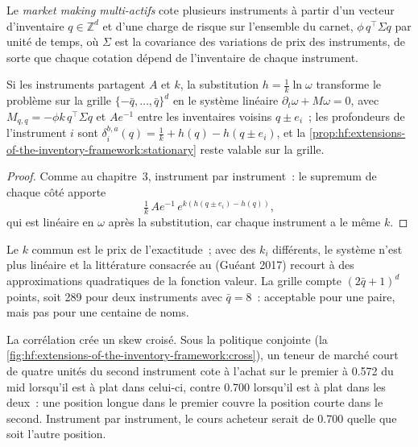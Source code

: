\begin{definition}\label{def:hf:extensions-of-the-inventory-framework:multi}
Le \emph{market making multi-actifs} cote plusieurs instruments à partir d'un vecteur d'inventaire $q\in\mathbb Z^d$ et d'une
charge de risque sur l'ensemble du carnet, $\phi\,q^\top\Sigma q$ par unité de temps, où $\Sigma$ est la covariance des variations de prix des instruments, de sorte que chaque
cotation dépend de l'inventaire de chaque instrument.
\end{definition}

\begin{proposition}\label{prop:hf:extensions-of-the-inventory-framework:multi}
Si les instruments partagent $A$ et $k$, la substitution $h=\tfrac1k\ln\omega$ transforme le problème sur la grille $\{-\bar q,\dots,\bar q\}^d$ en le
système linéaire $\partial_t\omega+M\omega=0$, avec $M_{q,q}=-\phi k\,q^\top\Sigma q$ et $Ae^{-1}$ entre les inventaires voisins $q\pm e_i$~; les
profondeurs de l'instrument $i$ sont $\delta^{b,a}_i(q)=\tfrac1k+h(q)-h(q\pm e_i)$, et la \cref{prop:hf:extensions-of-the-inventory-framework:stationary}
reste valable sur la grille.
\end{proposition}

\begin{proof}
Comme au chapitre~3, instrument par instrument~: le supremum de chaque côté apporte
\[
\tfrac1k\,Ae^{-1}\,e^{k(h(q\pm e_i)-h(q))},
\]
qui est linéaire en $\omega$ après la substitution, car chaque instrument a le même $k$.
\end{proof}

Le $k$ commun est le prix de l'exactitude~; avec des $k_i$ différents, le système n'est plus linéaire et la littérature consacrée au  (Guéant 2017) recourt à des
approximations quadratiques de la fonction valeur. La grille compte $(2\bar q+1)^d$ points, soit 289 pour deux instruments avec $\bar q=8$~: acceptable pour une paire, mais
pas pour une centaine de noms.

La corrélation crée un skew croisé. Sous la politique conjointe (la \cref{fig:hf:extensions-of-the-inventory-framework:cross}), un teneur de marché court de quatre
unités du second instrument cote à l'achat sur le premier à 0.572 du mid lorsqu'il est à plat dans celui-ci, contre 0.700 lorsqu'il est à plat dans les deux~: une position longue dans le
premier couvre la position courte dans le second. Instrument par instrument, le cours acheteur serait de 0.700 quelle que soit l'autre position.

